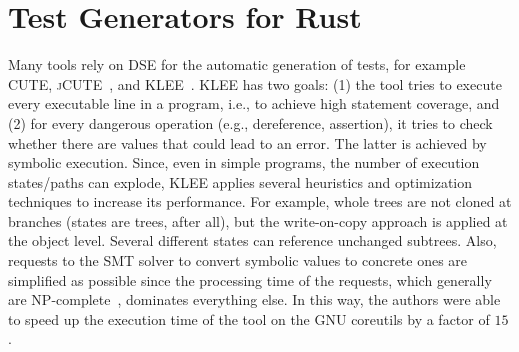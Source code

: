 \documentclass[paper=a4,%
  twoside,%
  BCOR4mm,%
  abstract=true,%
  toc=bibliography,%
  chapterprefix=true,%
  toc=bibliographynumbered,%
  open=right,%
  english,%
  pagesize=pdftex]{scrreprt}
\begin{document}
\section{Test Generators for Rust}

Many tools rely on \ac{DSE} for the automatic generation of tests, for example \textsc{CUTE}, \textsc{jCUTE}~\cite{Sen2006}, and \textsc{KLEE}~\cite{cadar2008klee}. \textsc{KLEE} has two goals: (1) the tool tries to execute every executable line in a program, i.e., to achieve high statement coverage, and (2) for every dangerous operation (e.g., dereference, assertion), it tries to check whether there are values that could lead to an error. The latter is achieved by symbolic execution. Since, even in simple programs, the number of execution states/paths can explode, \textsc{KLEE} applies several heuristics and optimization techniques to increase its performance. For example, whole trees are not cloned at branches (states are trees, after all), but the write-on-copy approach is applied at the object level. Several different states can reference unchanged subtrees. Also, requests to the \ac{SMT} solver to convert symbolic values to concrete ones are simplified as possible since the processing time of the requests, which generally are NP-complete~\cite{Lewis1983}, dominates everything else. In this way, the authors were able to speed up the execution time of the tool on the GNU coreutils by a factor of $15$.
\end{document}
